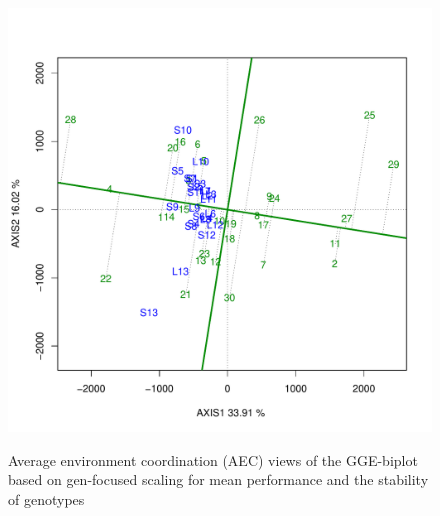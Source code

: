 \begin{figure} [H]
	\centering  
	\scalebox{0.3}
	{\includegraphics[width=460mm]{02ThesisMain/Ch04RD/figures/AEC}}
	\caption[Average environment coordination (AEC) views of the GGE-biplot]{Average environment coordination (AEC) views of the GGE-biplot based on gen-focused scaling for mean performance and the stability of genotypes}
\label{Figure:4.6}
\end{figure}




